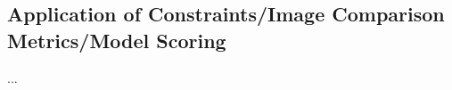 \documentclass[twocolumn,tighten,dvipsnames,linenumbers]{aastex63}
\newcommand\note[1]{{\color{OliveGreen}[note: #1]}}
\begin{document}
\subsection{Application of Constraints/Image Comparison Metrics/Model Scoring}
\label{sec:apply}

...










\end{document}
